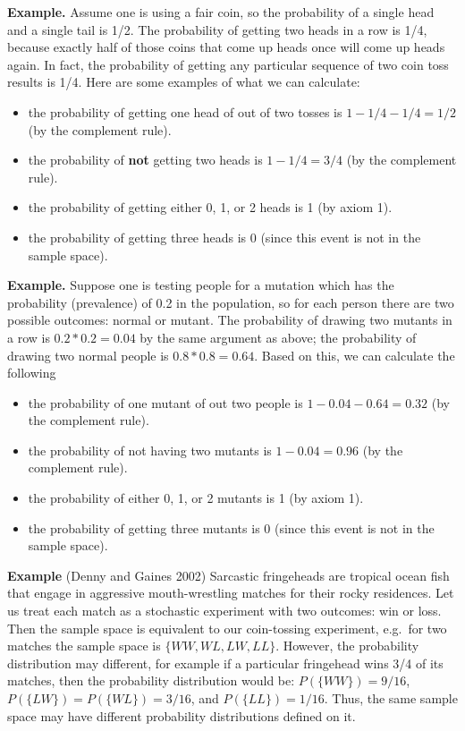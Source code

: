 \documentclass[
  letterpaper,
  DIV=11,
  numbers=noendperiod]{scrreprt}
\providecommand{\tightlist}{%
  \setlength{\itemsep}{0pt}\setlength{\parskip}{0pt}}\usepackage{longtable,booktabs,array}
\begin{document}
\textbf{Example.} Assume one is using a fair coin, so the probability of
a single head and a single tail is 1/2. The probability of getting two
heads in a row is 1/4, because exactly half of those coins that come up
heads once will come up heads again. In fact, the probability of getting
any particular sequence of two coin toss results is 1/4. Here are some
examples of what we can calculate:

\begin{itemize}
\tightlist
\item
  the probability of getting one head of out of two tosses is
  \(1-1/4-1/4=1/2\) (by the complement rule).
\item
  the probability of \textbf{not} getting two heads is \(1-1/4 = 3/4\)
  (by the complement rule).
\item
  the probability of getting either 0, 1, or 2 heads is 1 (by axiom 1).
\item
  the probability of getting three heads is 0 (since this event is not
  in the sample space).
\end{itemize}

\textbf{Example.} Suppose one is testing people for a mutation which has
the probability (prevalence) of 0.2 in the population, so for each
person there are two possible outcomes: normal or mutant. The
probability of drawing two mutants in a row is \(0.2*0.2=0.04\) by the
same argument as above; the probability of drawing two normal people is
\(0.8*0.8 =0.64\). Based on this, we can calculate the following

\begin{itemize}
\tightlist
\item
  the probability of one mutant of out two people is
  \(1-0.04-0.64=0.32\) (by the complement rule).
\item
  the probability of not having two mutants is \(1-0.04 = 0.96\) (by the
  complement rule).
\item
  the probability of either 0, 1, or 2 mutants is 1 (by axiom 1).
\item
  the probability of getting three mutants is 0 (since this event is not
  in the sample space).
\end{itemize}

\textbf{Example} (Denny and Gaines 2002) Sarcastic fringeheads are
tropical ocean fish that engage in aggressive mouth-wrestling matches
for their rocky residences. Let us treat each match as a stochastic
experiment with two outcomes: win or loss. Then the sample space is
equivalent to our coin-tossing experiment, e.g.~for two matches the
sample space is \(\{ WW, WL, LW, LL \}\). However, the probability
distribution may different, for example if a particular fringehead wins
3/4 of its matches, then the probability distribution would be:
\(P(\{ WW \}) = 9/16\), \(P(\{ LW \}) = P(\{WL\}) = 3/16\), and
\(P(\{LL\}) = 1/16\). Thus, the same sample space may have different
probability distributions defined on it.
\end{document}
